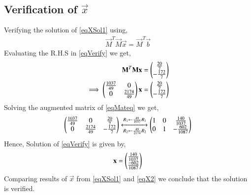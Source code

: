 \documentclass[journal,12pt,twocolumn]{IEEEtran}
\begin{document}
\subsection{Verification of $\vec{x}$}
Verifying the solution of \eqref{eqXSol1} using,
\begin{align}
	\vec{M}^T\vec{M}\vec{x} = \vec{M}^T\vec{b}\label{eqVerify}
\end{align}
Evaluating the R.H.S in \eqref{eqVerify} we get,
\begin{align}
	\mathbf{M}^T\mathbf{M}\mathbf{x} &= \begin{pmatrix}\frac{20}{7}\\ - \frac{172}{7}\end{pmatrix}\\
	\implies\begin{pmatrix}\frac{1037}{49} & 0 \\ 0 & \frac{2174}{49}\end{pmatrix}\mathbf{x} &= \begin{pmatrix}\frac{20}{7}\\ -\frac{172}{7}\end{pmatrix}\label{eqMateq}
\end{align}
Solving the augmented matrix of \eqref{eqMateq} we get,
\begin{align}
	\begin{pmatrix}\frac{1037}{49} & 0 & \frac{20}{7} \\ 0 & \frac{2174}{49} & -\frac{172}{7}\end{pmatrix} 
	\xleftrightarrow[R_2 \leftarrow \frac{49}{2174}R_2]{R_1 \leftarrow \frac{49}{1037}R_1}
	\begin{pmatrix}1 & 0 & \frac{140}{1037} \\ 0 & 1 & -\frac{602}{1087}\end{pmatrix}
\end{align}
Hence, Solution of \eqref{eqVerify} is given by,
\begin{align}
	\mathbf{x}=\begin{pmatrix}\frac{140}{1037} \\ \frac{-602}{1087}\end{pmatrix}\label{eqX2}
\end{align}
Comparing results of $\vec{x}$ from \eqref{eqXSol1} and \eqref{eqX2} we conclude that the solution is verified.
\end{document}
